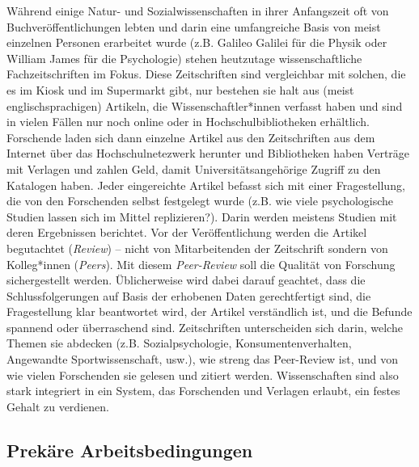 \documentclass[
  letterpaper,
  DIV=11,
  numbers=noendperiod]{scrreprt}
\begin{document}
Während einige Natur- und Sozialwissenschaften in ihrer Anfangszeit oft
von Buchveröffentlichungen lebten und darin eine umfangreiche Basis von
meist einzelnen Personen erarbeitet wurde (z.B. Galileo Galilei für die
Physik oder William James für die Psychologie) stehen heutzutage
wissenschaftliche Fachzeitschriften im Fokus. Diese Zeitschriften sind
vergleichbar mit solchen, die es im Kiosk und im Supermarkt gibt, nur
bestehen sie halt aus (meist englischsprachigen) Artikeln, die
Wissenschaftler*innen verfasst haben und sind in vielen Fällen nur noch
online oder in Hochschulbibliotheken erhältlich. Forschende laden sich
dann einzelne Artikel aus den Zeitschriften aus dem Internet über das
Hochschulnetezwerk herunter und Bibliotheken haben Verträge mit Verlagen
und zahlen Geld, damit Universitätsangehörige Zugriff zu den Katalogen
haben. Jeder eingereichte Artikel befasst sich mit einer Fragestellung,
die von den Forschenden selbst festgelegt wurde (z.B. wie viele
psychologische Studien lassen sich im Mittel replizieren?). Darin werden
meistens Studien mit deren Ergebnissen berichtet. Vor der
Veröffentlichung werden die Artikel begutachtet (\emph{Review}) -- nicht
von Mitarbeitenden der Zeitschrift sondern von Kolleg*innen
(\emph{Peers}). Mit diesem \emph{Peer-Review} soll die Qualität von
Forschung sichergestellt werden. Üblicherweise wird dabei darauf
geachtet, dass die Schlussfolgerungen auf Basis der erhobenen Daten
gerechtfertigt sind, die Fragestellung klar beantwortet wird, der
Artikel verständlich ist, und die Befunde spannend oder überraschend
sind. Zeitschriften unterscheiden sich darin, welche Themen sie abdecken
(z.B. Sozialpsychologie, Konsumentenverhalten, Angewandte
Sportwissenschaft, usw.), wie streng das Peer-Review ist, und von wie
vielen Forschenden sie gelesen und zitiert werden. Wissenschaften sind
also stark integriert in ein System, das Forschenden und Verlagen
erlaubt, ein festes Gehalt zu verdienen.

\subsection{Prekäre Arbeitsbedingungen}\label{sec-arbeitsbedingungen}
\end{document}
